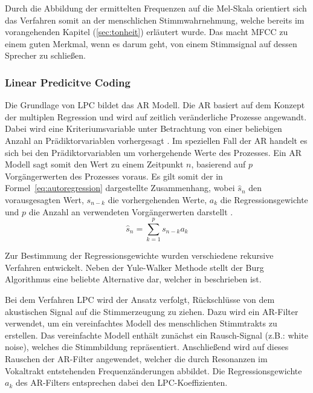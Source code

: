 Durch die Abbildung der ermittelten Frequenzen auf die Mel-Skala orientiert sich das Verfahren somit an der menschlichen Stimmwahrnehmung, welche bereits im vorangehenden Kapitel (\ref{sec:tonheit}) erläutert wurde.
Das macht \ac{MFCC} zu einem guten Merkmal, wenn es darum geht, von einem Stimmsignal auf dessen Sprecher zu schließen.

\subsubsection{Linear Predicitve Coding}

\textauthor{\vHS}{}{}

Die Grundlage von \ac{LPC} bildet das \ac{AR} Modell.
Die \ac{AR} basiert auf dem Konzept der multiplen Regression und wird auf zeitlich veränderliche Prozesse angewandt.
Dabei wird eine Kriteriumsvariable unter Betrachtung von einer beliebigen Anzahl an Prädiktorvariablen vorhergesagt \autocite[vgl.][S. 37-38]{canela_multiple_2019}.
Im speziellen Fall der \ac{AR} handelt es sich bei den Prädiktorvariablen um vorhergehende Werte des Prozesses.
Ein \ac{AR} Modell sagt somit den Wert zu einem Zeitpunkt $n$, basierend auf $p$ Vorgängerwerten des Prozesses voraus.
Es gilt somit der in Formel~\ref{eq:autoregression} dargestellte Zusammenhang, wobei $\hat{s}_n$ den vorausgesagten Wert, $s_{n-k}$ die vorhergehenden Werte, $a_{k}$ die Regressionsgewichte und $p$ die Anzahl an verwendeten Vorgängerwerten darstellt \autocite[][S. 1304]{atal_effectiveness_1974}.
\begin{equation}
  \hat{s}_{n} = \sum_{k=1}^{p} s_{n-k}a_{k}
  \label{eq:autoregression}
\end{equation}

Zur Bestimmung der Regressionsgewichte wurden verschiedene rekursive Verfahren entwickelt.
Neben der Yule-Walker Methode stellt der Burg Algorithmus eine beliebte Alternative dar, welcher in \citeauthor[][S. 443]{marple_new_1980} beschrieben ist.

Bei dem Verfahren \ac{LPC} wird der Ansatz verfolgt, Rückschlüsse von dem akustischen Signal auf die Stimmerzeugung zu ziehen.
Dazu wird ein \ac{AR}-Filter verwendet, um ein vereinfachtes Modell des menschlichen Stimmtrakts zu erstellen.
Das vereinfachte Modell enthält zunächst ein Rausch-Signal (z.B.: white noise), welches die Stimmbildung repräsentiert.
Anschließend wird auf dieses Rauschen der \ac{AR}-Filter angewendet, welcher die durch Resonanzen im Vokaltrakt entstehenden Frequenzänderungen abbildet.
Die Regressionsgewichte $a_k$ des \ac{AR}-Filters entsprechen dabei den \ac{LPC}-Koeffizienten.

